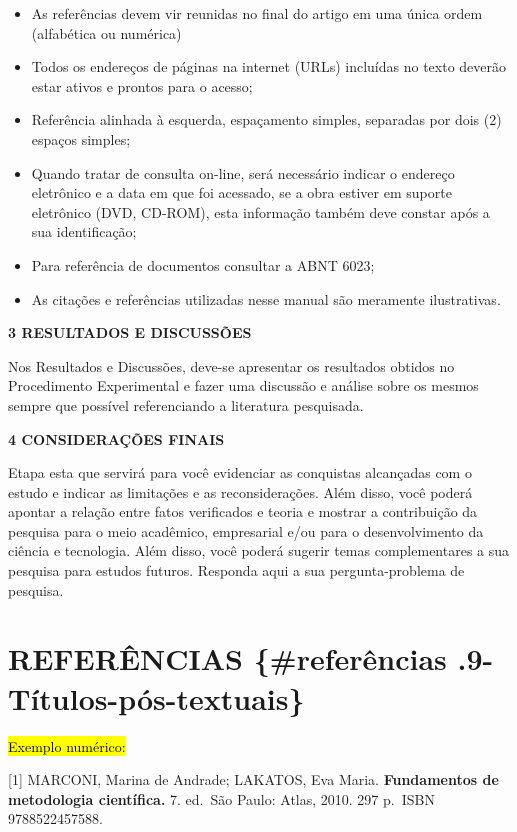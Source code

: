 \documentclass[
]{article}
\begin{document}
\begin{itemize}
\item
  As referências devem vir reunidas no final do artigo em uma única
  ordem (alfabética ou numérica)
\item
  Todos os endereços de páginas na internet (URLs) incluídas no texto
  deverão estar ativos e prontos para o acesso;
\item
  Referência alinhada à esquerda, espaçamento simples, separadas por
  dois (2) espaços simples;
\item
  Quando tratar de consulta on-line, será necessário indicar o endereço
  eletrônico e a data em que foi acessado, se a obra estiver em suporte
  eletrônico (DVD, CD-ROM), esta informação também deve constar após a
  sua identificação;
\item
  Para referência de documentos consultar a ABNT 6023;
\item
  As citações e referências utilizadas nesse manual são meramente
  ilustrativas.
\end{itemize}

\textbf{3 RESULTADOS E DISCUSSÕES}

Nos Resultados e Discussões, deve-se apresentar os resultados obtidos no
Procedimento Experimental e fazer uma discussão e análise sobre os
mesmos sempre que possível referenciando a literatura pesquisada.

\textbf{4 CONSIDERAÇÕES FINAIS}

Etapa esta que servirá para você evidenciar as conquistas alcançadas com
o estudo e indicar as limitações e as reconsiderações. Além disso, você
poderá apontar a relação entre fatos verificados e teoria e mostrar a
contribuição da pesquisa para o meio acadêmico, empresarial e/ou para o
desenvolvimento da ciência e tecnologia. Além disso, você poderá sugerir
temas complementares a sua pesquisa para estudos futuros. Responda aqui
a sua pergunta-problema de pesquisa.

\section{REFERÊNCIAS \{\#referências
.9-Títulos-pós-textuais\}}\label{referuxeancias-referuxeancias-.9-tuxedtulos-puxf3s-textuais}

\hl{Exemplo numérico:}

{[}1{]} MARCONI, Marina de Andrade; LAKATOS, Eva Maria.
\textbf{Fundamentos de metodologia científica. }7. ed.~São Paulo: Atlas,
2010. 297 p.~ISBN 9788522457588.
\end{document}

